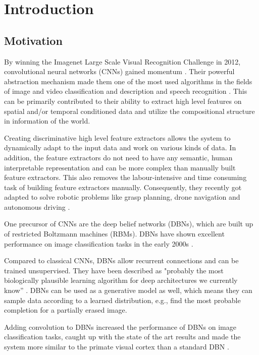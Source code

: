 \chapter{Introduction}

\section{Motivation} \label{c:motiv}

By winning the Imagenet Large Scale Visual Recognition Challenge in 2012, convolutional neural networks (CNNs) gained momentum \cite{NIPS2012_4824}. 
Their powerful abstraction mechanism made them one of the most used algorithms in the fields of image and video classification and description and speech recognition \cite{abdel2014convolutional, karpathy2014large, LeCun2015, szegedy2015going}. 
This can be primarily contributed to their ability to extract high level features on spatial and/or temporal conditioned data and utilize the compositional structure in information of the world.

Creating discriminative high level feature extractors allows the system to dynamically adapt to the input data and work on various kinds of data. 
In addition, the feature extractors do not need to have any semantic, human interpretable representation and can be more complex than manually built feature extractors. 
This also removes the labour-intensive and time consuming task of building feature extractors manually.
Consequently, they recently got adapted to solve robotic problems like grasp planning, drone navigation and autonomous driving \cite{chen2015deepdriving, giusti2016machine, levine2016learning}. 

One precursor of CNNs are the deep belief networks (DBNs), which are built up of restricted Boltzmann machines (RBMs). 
DBNs have shown excellent performance on image classification tasks in the early 2000s \cite{hinton2006fast, lee2009convolutional}.

Compared to classical CNNs, DBNs allow recurrent connections and can be trained unsupervised. 
They have been described as  "probably the most biologically plausible learning algorithm for deep architectures we currently know” \cite{bengio2015towards}. 
DBNs can be used as a generative model as well, which means they can sample data according to a learned distribution, e.g., find the most probable completion for a partially erased image.

Adding convolution to DBNs increased the performance of DBNs on image classification tasks, caught up with the state of the art results and made the system more similar to the primate visual cortex than a standard DBN \cite{lee2009convolutional}. 

